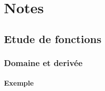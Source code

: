 \chapter{Notes}
\section{Etude de fonctions}
\subsection{Domaine et derivée}
\subsubsection*{Exemple}